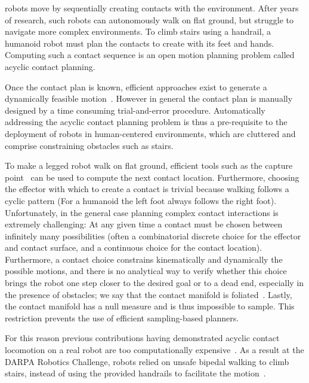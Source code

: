 \newcommand{\Pa}{$\mathcal{P}_1$ }
\newcommand{\Pb}{$\mathcal{P}_2$ }

 robots move by sequentially creating contacts with the environment.
After years of research, such robots can autonomously walk on flat ground, but struggle to navigate more complex environments.
To climb stairs using a handrail, a humanoid robot must plan the contacts to create with its feet and hands. Computing such a contact sequence is an open motion planning problem called acyclic contact planning.

Once the contact plan is known, efficient approaches exist to generate a dynamically feasible motion~\citep{Carpentier2016}. However in general
the contact plan is manually designed by a time consuming trial-and-error procedure. Automatically addressing the acyclic contact planning problem is thus a pre-requisite to the deployment of robots in human-centered environments, which are cluttered and comprise constraining obstacles such as stairs.

To make a legged robot walk on flat ground, efficient tools such as the capture point~\citep{Pratt2006} can be used to compute the next contact location. Furthermore, choosing the effector with which to create a contact is trivial because walking follows a cyclic pattern (For a humanoid the left foot always follows the right foot).
Unfortunately, in the general case planning complex contact interactions is extremely challenging:
At any given time a contact must be chosen between infinitely many possibilities (often a combinatorial discrete choice for the effector and contact surface, and a continuous choice for the contact location). Furthermore, a contact choice constrains kinematically and dynamically the possible motions, and there is no analytical way to verify whether this choice brings the robot one step closer to the desired goal or to a dead end, especially in the presence of obstacles; we say that the contact manifold is foliated~\citep{simeon-manipulation-04}. Lastly, the contact manifold has a null measure and is thus impossible to sample. This restriction prevents the use of efficient sampling-based planners.


For this reason previous contributions having demonstrated acyclic contact locomotion on a real robot are too computationally expensive~\citep{Bretl:2006:MPM:1124573.1124585}. As a result at the DARPA Robotics Challenge, robots relied on unsafe bipedal walking to climb stairs, instead of using the provided handrails to facilitate the motion~\citep{atkensondarpa}. 

